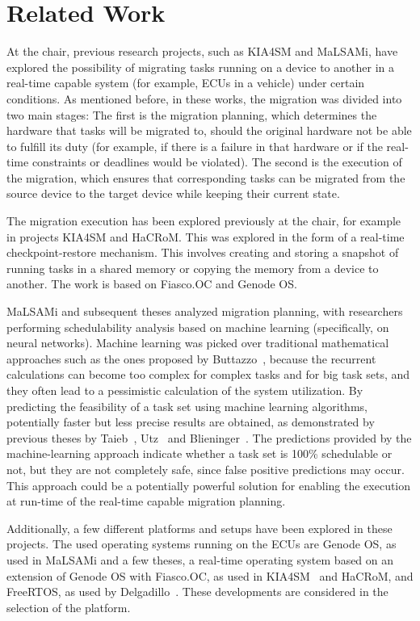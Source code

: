 \section*{Related Work}\label{section:relatedwork}
At the chair, previous research projects, such as KIA4SM and MaLSAMi, have explored the possibility of migrating tasks running on a device to another in a real-time capable system (for example, ECUs in a vehicle) under certain conditions. As mentioned before, in these works, the migration was divided into two main stages: The first is the migration planning, which determines the hardware that tasks will be migrated to, should the original hardware not be able to fulfill its duty (for example, if there is a failure in that hardware or if the real-time constraints or deadlines would be violated). The second is the execution of the migration, which ensures that corresponding tasks can be migrated from the source device to the target device while keeping their current state.

The migration execution has been explored previously at the chair, for example in projects KIA4SM and HaCRoM. This was explored in the form of a real-time checkpoint-restore mechanism. This involves creating and storing a snapshot of running tasks in a shared memory or copying the memory from a device to another. The work is based on Fiasco.OC and Genode OS. 

MaLSAMi and subsequent theses analyzed migration planning, with researchers performing schedulability analysis based on machine learning (specifically, on neural networks). Machine learning was picked over traditional mathematical approaches such as the ones proposed by Buttazzo~\parencite{buttazzo1}, because the recurrent calculations can become too complex for complex tasks and for big task sets, and they often lead to a pessimistic calculation of the system utilization. By predicting the feasibility of a task set using machine learning algorithms, potentially faster but less precise results are obtained, as demonstrated by previous theses by Taieb~\parencite{taieb1}, Utz~\parencite{utz1} and Blieninger~\parencite{blieninger1}. The predictions provided by the machine-learning approach indicate whether a task set is 100\% schedulable or not, but they are not completely safe, since false positive predictions may occur. This approach could be a potentially powerful solution for enabling the execution at run-time of the real-time capable migration planning. 

Additionally, a few different platforms and setups have been explored in these projects. The used operating systems running on the ECUs are Genode OS, as used in MaLSAMi and a few theses, a real-time operating system based on an extension of Genode OS with Fiasco.OC, as used in KIA4SM~\parencite{kia1} and HaCRoM, and FreeRTOS, as used by Delgadillo~\parencite{delgadillo1}. These developments are considered in the selection of the platform.

